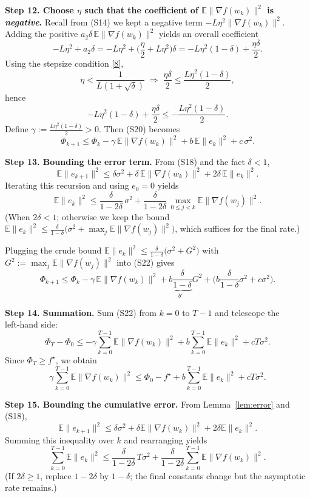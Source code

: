 \documentclass{article}
\begin{document}
\noindent\textbf{Step 12. Choose $\eta$ such that the coefficient of $\mathbb{E}\|\nabla f(w_k)\|^2$ is \emph{negative}.}  
Recall from (S14) we kept a negative term $-L\eta^2\|\nabla f(w_k)\|^2$. Adding the positive $a_2\delta\,\mathbb{E}\|\nabla f(w_k)\|^2$ yields an overall coefficient
\[
-L\eta^2 + a_2\delta
= -L\eta^2 + \Big(\frac{\eta}{2}+L\eta^2\Big)\delta
= -L\eta^2(1-\delta) + \frac{\eta\delta}{2} .
\]
Using the stepsize condition \eqref{8},
\[
\eta < \frac{1}{L(1+\sqrt{\delta})}
\;\Longrightarrow\;
\frac{\eta\delta}{2}\le \frac{L\eta^2(1-\delta)}{2},
\]
hence
\[
-L\eta^2(1-\delta) + \frac{\eta\delta}{2}\le -\frac{L\eta^2(1-\delta)}{2}.
\tag{S21}
\]
Define $\gamma:=\frac{L\eta^2(1-\delta)}{2}>0$. Then (S20) becomes
\[
\Phi_{k+1}\le \Phi_k - \gamma\,\mathbb{E}\|\nabla f(w_k)\|^2
+ b\,\mathbb{E}\|e_k\|^2 + c\,\sigma^2 .
\tag{S22}
\]

\noindent\textbf{Step 13. Bounding the error term.}  
From (S18) and the fact $\delta<1$,
\[
\mathbb{E}\|e_{k+1}\|^2\le \delta\sigma^2 + \delta\,\mathbb{E}\|\nabla f(w_k)\|^2 +2\delta\,\mathbb{E}\|e_k\|^2 .
\]
Iterating this recursion and using $e_0=0$ yields
\[
\mathbb{E}\|e_k\|^2 \le \frac{\delta}{1-2\delta}\,\sigma^2
+ \frac{\delta}{1-2\delta}\,\max_{0\le j<k}\mathbb{E}\|\nabla f(w_j)\|^2 .
\tag{S23}
\]
(When $2\delta<1$; otherwise we keep the bound $\mathbb{E}\|e_k\|^2\le \frac{\delta}{1-\delta}\big(\sigma^2+\max_j\mathbb{E}\|\nabla f(w_j)\|^2\big)$, which suffices for the final rate.)

Plugging the crude bound $\mathbb{E}\|e_k\|^2\le \frac{\delta}{1-\delta}\big(\sigma^2+G^2\big)$ with $G^2:=\max_j\mathbb{E}\|\nabla f(w_j)\|^2$ into (S22) gives
\[
\Phi_{k+1}\le \Phi_k - \gamma\,\mathbb{E}\|\nabla f(w_k)\|^2
+ \underbrace{b\frac{\delta}{1-\delta}}_{b'} G^2
+ \Big(b\frac{\delta}{1-\delta}\sigma^2 + c\sigma^2\Big) .
\tag{S24}
\]

\noindent\textbf{Step 14. Summation.}  
Sum (S22) from $k=0$ to $T-1$ and telescope the left‑hand side:
\[
\Phi_T - \Phi_0 \le -\gamma\sum_{k=0}^{T-1}\mathbb{E}\|\nabla f(w_k)\|^2
+ b\sum_{k=0}^{T-1}\mathbb{E}\|e_k\|^2
+ cT\sigma^2 .
\tag{S25}
\]
Since $\Phi_T\ge f^\star$, we obtain
\[
\gamma\sum_{k=0}^{T-1}\mathbb{E}\|\nabla f(w_k)\|^2
\le \Phi_0-f^\star
+ b\sum_{k=0}^{T-1}\mathbb{E}\|e_k\|^2
+ cT\sigma^2 .
\tag{S26}
\]

\noindent\textbf{Step 15. Bounding the cumulative error.}  
From Lemma~\ref{lem:error} and (S18),
\[
\mathbb{E}\|e_{k+1}\|^2 \le \delta\sigma^2 +\delta\mathbb{E}\|\nabla f(w_k)\|^2 +2\delta\mathbb{E}\|e_k\|^2 .
\]
Summing this inequality over $k$ and rearranging yields
\[
\sum_{k=0}^{T-1}\mathbb{E}\|e_k\|^2
\le \frac{\delta}{1-2\delta}\,T\sigma^2
+ \frac{\delta}{1-2\delta}\sum_{k=0}^{T-1}\mathbb{E}\|\nabla f(w_k)\|^2 .
\tag{S27}
\]
(If $2\delta\ge1$, replace $1-2\delta$ by $1-\delta$; the final constants change but the asymptotic rate remains.)
\end{document}
